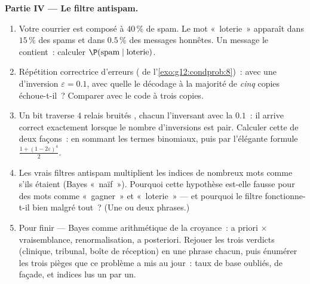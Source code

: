 \begin{problem}
\medskip
\noindent\textbf{Partie IV --- Le filtre antispam.}
\begin{enumerate}[resume]
  \item Votre courrier est composé à $40\,\%$ de spam. Le mot
        «~loterie~» apparaît dans $15\,\%$ des spams et dans
        $0.5\,\%$ des messages honnêtes. Un message le contient~:
        calculer $\P(\text{spam} \mid \text{loterie})$.
  \item Répétition correctrice d'erreurs ( de
        l'\cref{exo:g12:condprob:8})~: avec une 
        d'inversion $\varepsilon = 0.1$, avec quelle  le
        décodage à la majorité de \emph{cinq} copies échoue-t-il~?
        Comparer avec le code à trois copies.
  \item Un bit traverse $4$ relais bruités , chacun
        l'inversant avec la  $0.1$~: il arrive correct
        exactement lorsque le nombre d'inversions est pair. Calculer
        cette  de deux façons~: en sommant les termes
        binomiaux, puis par l'élégante formule
        $\frac{1 + (1 - 2\varepsilon)^4}{2}$.
  \item Les vrais filtres antispam multiplient les indices de
        nombreux mots comme s'ils étaient  (Bayes
        «~naïf~»). Pourquoi cette hypothèse est-elle fausse pour des
        mots comme «~gagner~» et «~loterie~» --- et pourquoi le
        filtre fonctionne-t-il bien malgré tout~? (Une ou deux
        phrases.)
  \item Pour finir --- Bayes comme arithmétique de la croyance~: a
        priori $\times$ vraisemblance, renormalisation, a
        posteriori. Rejouer les trois verdicts (clinique, tribunal,
        boîte de réception) en une phrase chacun, puis énumérer les
        trois pièges que ce problème a mis au jour~: taux de base
        oubliés,  de façade, et indices lus un par un.
\end{enumerate}
\end{problem}
